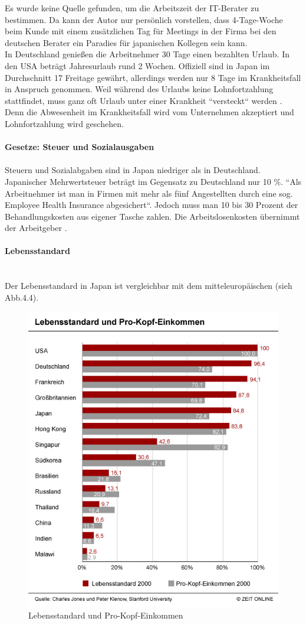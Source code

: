 	Es wurde keine Quelle gefunden, um die Arbeitszeit der IT-Berater zu bestimmen. Da kann der Autor nur persönlich vorstellen, dass 4-Tage-Woche beim Kunde mit einem zusätzlichen Tag für Meetings in der Firma bei den deutschen Berater ein Paradies für japanischen Kollegen sein kann. \\
	In Deutschland genießen die Arbeitnehmer 30 Tage einen bezahlten Urlaub. In den USA beträgt Jahresurlaub rund 2 Wochen. Offiziell sind in Japan im Durchschnitt 17 Freitage gewährt, allerdings werden nur 8 Tage im Krankheitsfall in Anspruch genommen. Weil während des Urlaubs keine Lohnfortzahlung stattfindet, muss ganz oft Urlaub unter einer Krankheit ``versteckt`` werden \cite{JPArbeitSozKultur}. Denn die Abwesenheit im Krankheitsfall wird vom Unternehmen akzeptiert und Lohnfortzahlung wird geschehen.\\
	\\
		\textbf{Gesetze: Steuer und Sozialausgaben}\\
		\\
		Steuern und Sozialabgaben sind in Japan niedriger als in Deutschland. Japanischer Mehrwertsteuer beträgt im Gegensatz zu Deutschland nur 10 \%.
		``Als Arbeitnehmer ist man in Firmen mit mehr als fünf Angestellten durch eine sog. Employee Health Insurance abgesichert``. Jedoch muss man 10 bis 30 Prozent der Behandlungskosten aus eigener Tasche zahlen. Die Arbeitslosenkosten übernimmt der Arbeitgeber \cite{ArbZeitJP}. \\
	\\
			\textbf{Lebensstandard}\\
			\\
		\\Der Lebensstandard in Japan ist vergleichbar mit dem mitteleuropäischen (sieh Abb.4.4).
		\begin{figure}[ht]
		\centering
		\includegraphics[width=0.7\linewidth]{./images/Lebensstandard-Pro-Kopf-Einkommen}
		\caption{Lebensstandard und Pro-Kopf-Einkommen \cite{LebensStd}}
		\label{fig:LebStdProKEink}
		\end{figure}\\
